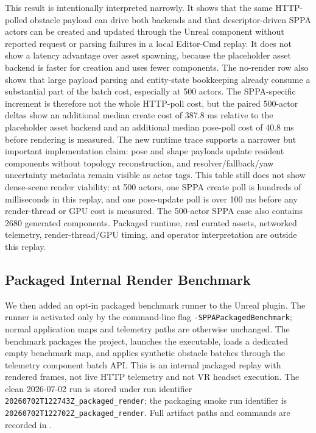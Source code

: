 ﻿\documentclass[11pt,a4paper]{article}
\begin{document}
This result is intentionally interpreted narrowly. It shows that the same
HTTP-polled obstacle payload can drive both backends and that descriptor-driven
SPPA actors can be created and updated through the Unreal component without
reported request or parsing failures in a local Editor-Cmd replay. It does not
show a latency advantage over asset spawning, because the placeholder asset
backend is faster for creation and uses fewer components. The no-render row also
shows that large payload parsing and entity-state bookkeeping already consume a
substantial part of the batch cost, especially at 500 actors. The SPPA-specific
increment is therefore not the whole HTTP-poll cost, but the paired 500-actor
deltas show an additional median create cost of 387.8 ms relative to the
placeholder asset backend and an additional median pose-poll cost of 40.8 ms
before rendering is measured. The new runtime trace supports a narrower but
important implementation claim: pose and shape payloads update resident
components without topology reconstruction, and resolver/fallback/yaw
uncertainty metadata remain visible as actor tags. This table still does not
show dense-scene render viability: at 500 actors, one SPPA create poll is
hundreds of milliseconds in this replay, and one pose-update poll is over
100 ms before any render-thread or GPU cost is measured. The 500-actor SPPA
case also contains 2680 generated components. Packaged runtime, real curated
assets, networked telemetry, render-thread/GPU timing, and operator
interpretation are outside this replay.

\subsection{Packaged Internal Render Benchmark}

We then added an opt-in packaged benchmark runner to the Unreal plugin. The
runner is activated only by the command-line flag
\texttt{-SPPAPackagedBenchmark}; normal application maps and telemetry paths
are otherwise unchanged. The benchmark packages the project, launches the executable, loads a dedicated
empty benchmark map, and applies synthetic obstacle batches through the
telemetry component batch API. This is an internal
packaged replay with rendered frames, not live HTTP telemetry and not VR
headset execution. The clean 2026-07-02 run is stored under
run identifier \texttt{20260702T122743Z\_packaged\_render}; the packaging smoke
run identifier is \texttt{20260702T122702Z\_packaged\_render}. Full artifact
paths and commands are recorded in
.
\end{document}

